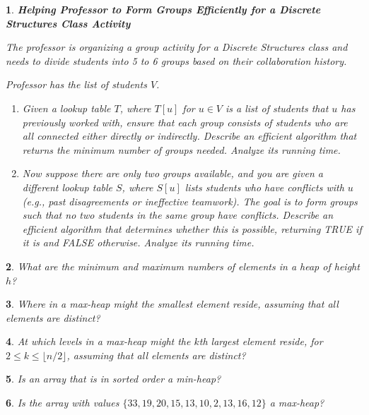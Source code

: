 \documentclass[%
addpoints]{exam}
\theoremstyle{problem}
\newtheorem{p}{}
\begin{document}
\begin{p}
\textbf{Helping Professor to Form Groups Efficiently for a Discrete Structures Class Activity}  

The professor is organizing a group activity for a Discrete Structures class and needs to divide students into 5 to 6 groups based on their collaboration history.  

Professor has the list of students \( V \).
\begin{enumerate}[label=\alph*)]
    \item Given a lookup table \( T \), where \( T[u] \) for \( u \in V \) is a list of students that \( u \) has previously worked with, ensure that each group consists of students who are all connected either directly or indirectly. Describe an efficient algorithm that returns the minimum number of groups needed. Analyze its running time. 
    \item Now suppose there are only two groups available, and you are given a different lookup table \( S \), where \( S[u] \) lists students who have conflicts with \( u \) (e.g., past disagreements or ineffective teamwork). The goal is to form groups such that no two students in the same group have conflicts. Describe an efficient algorithm that determines whether this is possible, returning TRUE if it is and FALSE otherwise. Analyze its running time.  
\end{enumerate}
\hfill\end{p}

\begin{p}
What are the minimum and maximum numbers of elements in a heap of height \( h \)?
\hfill\end{p}

\begin{p}
Where in a max-heap might the smallest element reside, assuming that all elements are distinct?
\hfill\end{p}

\begin{p} 
At which levels in a max-heap might the \( k \)th largest element reside, for \( 2 \leq k \leq \lfloor n/2 \rfloor \), assuming that all elements are distinct?  
\hfill  
\end{p}

\begin{p} 
Is an array that is in sorted order a min-heap?  
\hfill  
\end{p}

\begin{p} 
Is the array with values \( \{33, 19, 20, 15, 13, 10, 2, 13, 16, 12\} \) a max-heap?  
\hfill  
\end{p}
\end{document}
